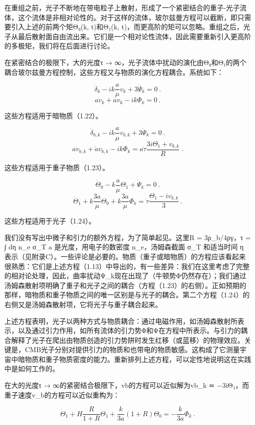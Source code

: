 在重组之前，光子不断地在带电粒子上散射，形成了一个紧密结合的重子-光子流体，这个流体是非相对论性的。对于这样的流体，玻尔兹曼方程可以截断，即只需要引入上述的前两个矩Θ₀(k, t)和Θ₁(k, t)，而更高阶的矩可以忽略。重组之后，光子从最后散射面自由流出来。它们是一个相对论性流体，因此需要重新引入更高阶的多极矩，我们将在后面进行讨论。

在紧密结合的极限下，大的光度τ → ∞，光子流体中扰动的演化由Θ₀和Θ₁的两个耦合玻尔兹曼方程控制，这些方程又与物质的演化方程耦合。系统如下：

\[ \dot{\delta}_k - ik \frac{a}{\mu} v_k + 3 \dot{\Psi}_k = 0~. \]
\[ a \dot{v}_k + \dot{a} v_k - ik \Phi_k = 0~. \]

这些方程适用于暗物质（1.22）。

\[ \dot{\delta}_{b,k} - ik \frac{a}{\mu} v_{b,k} + 3 \dot{\Psi}_k = 0~. \]
\[ a \dot{v}_{b,k} + \dot{a} v_{b,k} - ik \Phi_k = a \dot{\tau} \frac{3 i \Theta_1 + v_{b,k}}{R}~. \]

这些方程适用于重子物质（1.23）。

\[ \dot{\Theta}_0 - k \frac{a}{\mu} \Theta_1 + \dot{\Psi}_k = 0~. \]
\[ \dot{\Theta}_1 + k \frac{3 a}{\mu} \Theta_0 + k \frac{3 a}{\mu} \Phi_k = \dot{\tau} \frac{\Theta_1 - i v_{b,k}}{3}~. \]

这些方程适用于光子（1.24）。

我们没有写出中微子和引力的额外方程，为了简单起见。这里R = 3ρ_b/4ργ，τ = ∫ dη n_e σ_T a 是光度，用电子的数密度 n_e，汤姆森截面 σ_T 和适当时间 η 表示（见附录C）。一些评论是必要的。物质（重子或暗物质）的方程应该看起来很熟悉：它们是上述方程（1.13）中导出的，有一些差异：我们在这里考虑了完整的相对论处理，因此，曲率扰动Ψ_k现在出现了（牛顿势Φ仍然存在）；我们通过汤姆森散射项明确了重子和光子之间的耦合（方程（1.23）的右侧）。正如预期的那样，暗物质和重子物质之间的唯一区别是与光子的耦合。第二个方程（1.24）的右侧又是汤姆森散射项，它将光子与重子耦合起来。

上述方程表明，光子以两种方式与物质耦合：通过电磁作用，如汤姆森散射所表示，以及通过引力作用，如所有流体的引力势Φ和Ψ在方程中所表示。与引力的耦合解释了光子在爬出由物质创造的引力势阱时发生红移（或蓝移）的物理效应。关键是，CMB光子分别对提供引力的物质和也带电的物质敏感。这构成了它测量宇宙中暗物质和重子物质密度的能力。重新排列上述方程，可以定性地说明这在实践中是如何工作的。

在大的光度τ → ∞的紧密结合极限下，vb的方程可以近似解为vb_k ≃ −3iΘ₁，而重子速度v_b的方程可以近似重构为：

\[ \dot{\Theta}_1 + H \frac{R}{1 + R} \Theta_1 + \frac{k}{3a} (1 + R) \Theta_0 = -\frac{k}{3a} \Phi_k~. \]

